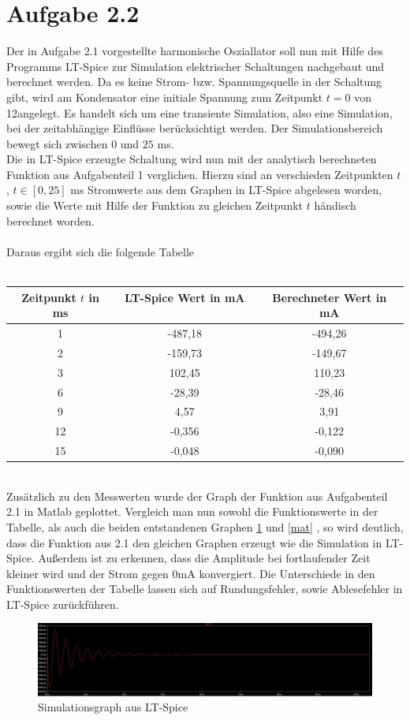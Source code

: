 \section{Aufgabe 2.2}\label{sec:ag2.2}
Der in Aufgabe 2.1 vorgestellte harmonische Osziallator soll nun mit Hilfe des Programms \glqq LT-Spice\grqq{} zur Simulation elektrischer Schaltungen nachgebaut und berechnet werden. Da es keine Strom- bzw. Spannungsquelle in der Schaltung gibt, wird am Kondensator eine initiale Spannung zum Zeitpunkt $t = 0$ von 12\volt angelegt. Es handelt sich um eine transiente Simulation, also eine Simulation, bei der zeitabhängige Einflüsse berücksichtigt werden. Der Simulationsbereich bewegt sich zwischen $0$ und $25$ \si{\milli\second}. \\
Die in LT-Spice erzeugte Schaltung wird nun mit der analytisch berechneten Funktion aus Aufgabenteil 1 verglichen. Hierzu sind an verschieden Zeitpunkten $t$ , $t \in [0,25]$ \si{\milli\second} Stromwerte aus dem Graphen in LT-Spice abgelesen worden, sowie die Werte mit Hilfe der Funktion zu gleichen Zeitpunkt $t$ händisch berechnet worden.\\ \\
Daraus ergibt sich die folgende Tabelle\\ \\

\begin{tabular}[h]{c|c|c}
	Zeitpunkt $t$ in \si{\milli\second} & LT-Spice Wert in \si{\milli\ampere} \ & Berechneter Wert in \si{\milli\ampere} \\
	\hline
	1 & -487,18 & -494,26 \\
	2 & -159,73 & -149,67\\
	3 & 102,45 & 110,23\\
	6 & -28,39 & -28,46\\
	9 & 4,57 & 3,91\\
	12 & -0,356 & -0,122\\
	15 & -0,048 & -0,090\\
\end{tabular}
\\

Zusätzlich zu den Messwerten wurde der Graph der Funktion aus Aufgabenteil 2.1 in Matlab geplottet. Vergleich man nun sowohl die Funktionswerte in der Tabelle, als auch die beiden entstandenen Graphen \ref{lt} und \ref{mat} , so wird deutlich, dass die Funktion aus 2.1 den gleichen Graphen erzeugt wie die Simulation in LT-Spice. Außerdem ist zu erkennen, dass die Amplitude bei fortlaufender Zeit kleiner wird und der Strom gegen $0$\si{\milli\ampere} konvergiert. Die Unterschiede in den Funktionswerten der Tabelle lassen sich auf Rundungsfehler, sowie Ablesefehler in LT-Spice zurückführen.
\begin{figure}[h]
	\centering
	\includegraphics[width=\textwidth]{data/ltsim}
	\caption{Simulationsgraph aus LT-Spice}
	\label{lt}
\end{figure}

